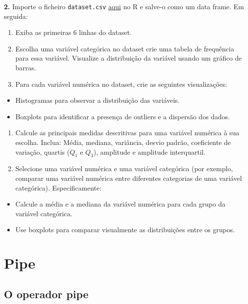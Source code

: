 \documentclass[
]{book}
\providecommand{\tightlist}{%
  \setlength{\itemsep}{0pt}\setlength{\parskip}{0pt}}
\begin{document}
\textbf{2.} Importe o ficheiro \texttt{dataset.csv} \href{https://renatorpaula.wixsite.com/renato/laboratorio-estatistica}{aqui} no R e salve-o como um data frame. Em seguida:

\begin{enumerate}
\def\labelenumi{(\alph{enumi})}
\item
  Exiba as primeiras 6 linhas do dataset.
\item
  Escolha uma variável categórica no dataset crie uma tabela de frequência para essa variável. Visualize a distribuição da variável usando um gráfico de barras.
\item
  Para cada variável numérica no dataset, crie as seguintes visualizações:
\end{enumerate}

\begin{itemize}
\tightlist
\item
  Histogramas para observar a distribuição das variáveis.
\item
  Boxplots para identificar a presença de outliers e a dispersão dos dados.
\end{itemize}

\begin{enumerate}
\def\labelenumi{(\alph{enumi})}
\setcounter{enumi}{3}
\item
  Calcule as principais medidas descritivas para uma variável numérica à sua escolha. Inclua: Média, mediana, variância, desvio padrão, coeficiente de variação, quartis (\(Q_1\) e \(Q_3\)), amplitude e amplitude interquartil.
\item
  Selecione uma variável numérica e uma variável categórica (por exemplo, comparar uma variável numérica entre diferentes categorias de uma variável categórica). Especificamente:
\end{enumerate}

\begin{itemize}
\tightlist
\item
  Calcule a média e a mediana da variável numérica para cada grupo da variável categórica.
\item
  Use boxplots para comparar visualmente as distribuições entre os grupos.
\end{itemize}

\chapter{Pipe}\label{pipe}

\section{O operador pipe}\label{o-operador-pipe}
\end{document}
